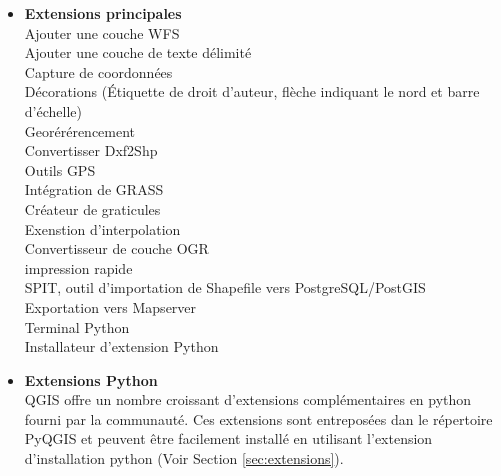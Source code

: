\begin{itemize}
\item \textbf{Extensions principales} \\
 Ajouter une couche WFS
\\ Ajouter une couche de texte d\'elimit\'e
\\ Capture de coordonn\'ees
\\ D\'ecorations (\'Etiquette de droit d'auteur, fl\`eche indiquant le nord et barre d'\'echelle)
\\ Geor\'er\'erencement
\\ Convertisser Dxf2Shp 
\\ Outils GPS 
\\ Int\'egration de GRASS
\\ Cr\'eateur de graticules
\\ Exenstion d'interpolation
\\ Convertisseur de couche OGR
\\ impression rapide
\\ SPIT, outil d'importation de Shapefile vers PostgreSQL/PostGIS
\\ Exportation vers Mapserver
\\ Terminal Python
\\ Installateur d'extension Python
\\ \item \textbf{Extensions Python}
\\ QGIS offre un nombre croissant d'extensions compl\'ementaires en python fourni par la communaut\'e. Ces extensions sont entrepos\'ees dan le r\'epertoire PyQGIS et peuvent \^etre facilement install\'e en utilisant l'extension d'installation python (Voir Section \ref{sec:extensions}).
\end{itemize}
